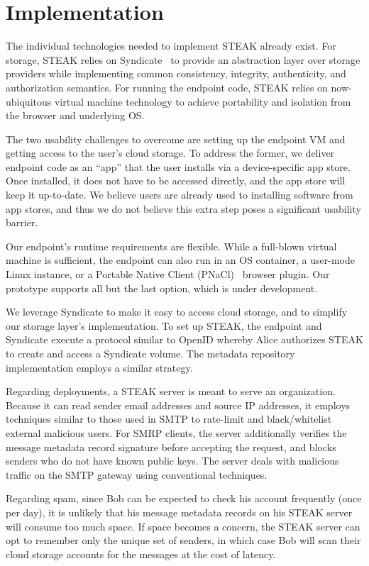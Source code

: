 \section{Implementation}
\label{sec:implementation}

The individual technologies needed to implement STEAK already exist.  For storage, STEAK relies on Syndicate~\cite{syndicate} to provide an abstraction layer over storage providers while implementing common consistency, integrity, authenticity, and authorization semantics.  For running the endpoint code, STEAK relies on now-ubiquitous virtual machine technology to achieve portability and isolation from the browser and underlying OS.

The two usability challenges to overcome are setting up the endpoint VM and getting access to the user's cloud storage.  To address the former, we deliver endpoint code as an “app” that the user installs via a device-specific app store.  Once installed, it does not have to be accessed directly, and the app store will keep it up-to-date.  We believe users are already used to installing software from app stores, and thus we do not believe this extra step poses a significant usability barrier.

Our endpoint's runtime requirements are flexible.  While a full-blown virtual machine is sufficient, the endpoint can also run in an OS container, a user-mode Linux instance, or a Portable Native Client (PNaCl)~\cite{pnacl} browser plugin.  Our prototype supports all but the last option, which is under development.

We leverage Syndicate to make it easy to access cloud storage, and to simplify our storage layer's implementation.  To set up STEAK, the endpoint and Syndicate execute a protocol similar to OpenID whereby Alice authorizes STEAK to create and access a Syndicate volume.  The metadata repository implementation employs a similar strategy.

Regarding deployments, a STEAK server is meant to serve an organization.  Because it can read sender email addresses and source IP addresses, it employs techniques similar to those used in SMTP to rate-limit and black/whitelist external malicious users.  For SMRP clients, the server additionally verifies the message metadata record signature before accepting the request, and blocks senders who do not have known public keys.  The server deals with malicious traffic on the SMTP gateway using conventional techniques.

Regarding spam, since Bob can be expected to check his account frequently (once per day), it is unlikely that his message metadata records on his STEAK server will consume too much space.  If space becomes a concern, the STEAK server can opt to remember only the unique set of senders, in which case Bob will scan their cloud storage accounts for the messages at the cost of latency.

